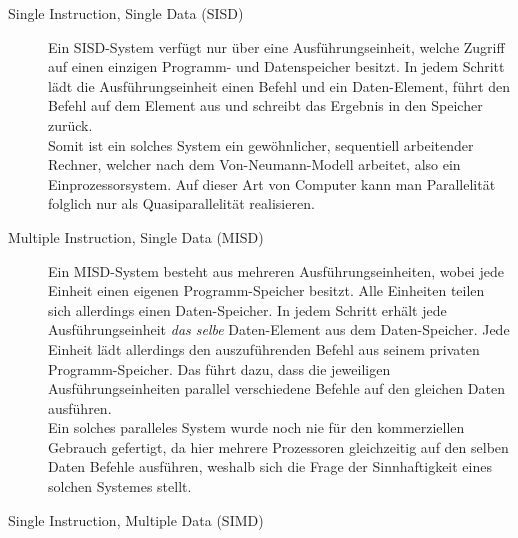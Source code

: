 				\begin{description}
					
					\item [Single Instruction, Single Data (SISD)]
					
						Ein SISD-System verfügt nur über eine Ausführungseinheit, welche Zugriff auf einen einzigen Programm- und Datenspeicher besitzt. In jedem Schritt lädt die Ausführungseinheit einen Befehl und ein Daten-Element, führt den Befehl auf dem Element aus und schreibt das Ergebnis in den Speicher zurück.\\
						Somit ist ein solches System ein gewöhnlicher, sequentiell arbeitender Rechner, welcher nach dem Von-Neumann-Modell arbeitet, also ein Einprozessorsystem. Auf dieser Art von Computer kann man Parallelität folglich nur als Quasiparallelität realisieren. \cite{ParaProgRauber} \cite{FlynnscheKlassifikationWikipedia} \cite{EntwicklungParallelerProgramme}
						
					\item [Multiple Instruction, Single Data (MISD)]
					
						Ein MISD-System besteht aus mehreren Ausführungseinheiten, wobei jede Einheit einen eigenen Programm-Speicher besitzt. Alle Einheiten teilen sich allerdings einen Daten-Speicher. In jedem Schritt erhält jede Ausführungseinheit \textit{das selbe} Daten-Element aus dem Daten-Speicher. Jede Einheit lädt allerdings den auszuführenden Befehl aus seinem privaten Programm-Speicher. Das führt dazu, dass die jeweiligen Ausführungseinheiten parallel verschiedene Befehle auf den gleichen Daten ausführen.\\
						Ein solches paralleles System wurde noch nie für den kommerziellen Gebrauch gefertigt, da hier mehrere Prozessoren gleichzeitig auf den selben Daten Befehle ausführen, weshalb sich die Frage der Sinnhaftigkeit eines solchen Systemes stellt. \cite{ParaProgRauber} \cite{FlynnscheKlassifikationWikipedia} \cite{EntwicklungParallelerProgramme}
					
					\item [Single Instruction, Multiple Data (SIMD)]
					

\end{description}
